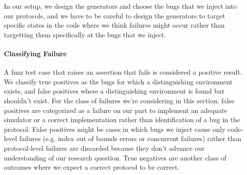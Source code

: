 In our setup, we design the generators and choose the bugs that we inject into our protocols, and we have to be careful to design the generators to target specific states in the code where we think failures might occur rather than targetting them specifically at the bugs that we inject.

\paragraph{Classifying Failure}
A fuzz test case that raises an assertion that fails is considered a positive result.
We classify true positives as the bugs for which a distinguishing environment exists, and false positives where a distinguishing environment is found but shouldn't exist.
For the class of failures we're considering in this section, false positives are categorized as a failure on our part to implement an adequate simulator or a correct implementation rather than identification of a bug in the protocol. 
False positives might be cases in which bugs we inject cause only code-level failures (e.g. index out of bounds errors or concurrent failures) rather than protocol-level failures are discarded because they don't advance our understanding of our research question.
True negatives are another class of outcomes where we expect a correct protocol to be correct. 

